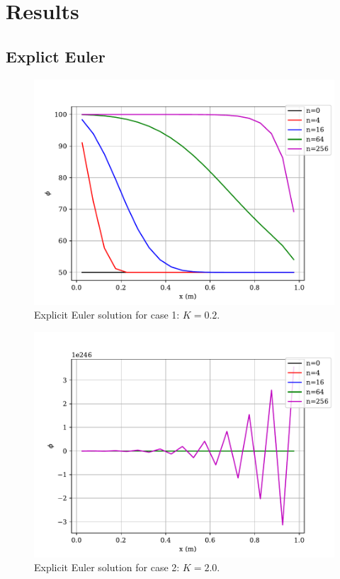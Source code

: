 \documentclass[12pt]{article}
\begin{document}
\section{Results}

\subsection{Explict Euler}
\begin{figure}[htbp]
    \centering
    \includegraphics[width=\textwidth]{plots/graph_EE_case1.pdf}
    \caption{Explicit Euler solution for case 1: $K=0.2$.}
\end{figure}

\begin{figure}[htbp]
    \centering
    \includegraphics[width=\textwidth]{plots/graph_EE_case2.pdf}
    \caption{Explicit Euler solution for case 2: $K=2.0$.}
\end{figure}
\end{document}
